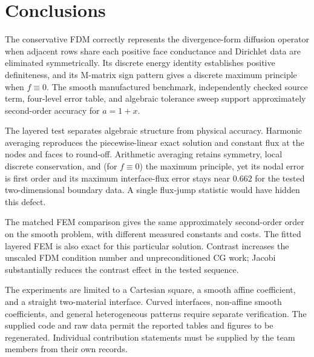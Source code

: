 \section{Conclusions}
The conservative FDM correctly represents the divergence-form diffusion
operator when adjacent rows share each positive face conductance and
Dirichlet data are eliminated symmetrically. Its discrete energy identity
establishes positive definiteness, and its M-matrix sign pattern gives a
discrete maximum principle when $f\equiv 0$. The smooth manufactured benchmark, independently
checked source term, four-level error table, and algebraic tolerance sweep
support approximately second-order accuracy for $a=1+x$.

The layered test separates algebraic structure from physical accuracy.
Harmonic averaging reproduces the piecewise-linear exact solution and
constant flux at the nodes and faces to round-off. Arithmetic averaging
retains symmetry, local discrete conservation, and (for $f\equiv0$) the maximum principle,
yet its nodal error is first order and its maximum interface-flux error
stays near $0.662$ for the tested two-dimensional boundary data. A single
flux-jump statistic would have hidden this defect.

The matched FEM comparison gives the same approximately second-order order
on the smooth problem, with different measured constants and costs. The
fitted layered FEM is also exact for this particular solution. Contrast
increases the unscaled FDM condition number and unpreconditioned CG work;
Jacobi substantially reduces the contrast effect in the tested sequence.

The experiments are limited to a Cartesian square, a smooth affine
coefficient, and a straight two-material interface. Curved interfaces,
non-affine smooth coefficients, and general heterogeneous patterns require
separate verification. The supplied code and raw data permit the reported
tables and figures to be regenerated. Individual contribution statements
must be supplied by the team members from their own records.
